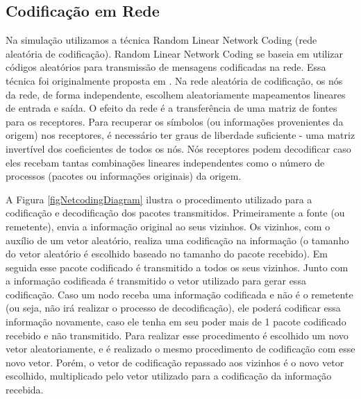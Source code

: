 \subsection{Codificação em Rede}\label{sec:codeRede}

Na simulação utilizamos a técnica Random Linear Network Coding (rede
aleatória de codificação). Random Linear Network Coding se baseia em
utilizar códigos aleatórios para transmissão de mensagens codificadas na
rede. Essa técnica foi originalmente proposta em \cite{Ho03thebenefits}.
Na rede aleatória de codificação, os nós da rede, de forma independente,
escolhem aleatoriamente mapeamentos lineares de entrada e saída. O efeito
da rede é a transferência de uma matriz de fontes para os receptores.
Para recuperar os símbolos (ou informações provenientes da origem) nos
receptores, é necessário ter graus de liberdade suficiente - uma matriz
invertível dos coeficientes de todos os nós. Nós receptores podem
decodificar caso eles recebam tantas combinações lineares independentes
como o número de processos (pacotes ou informações originais) da origem.

A Figura \ref{figNetcodingDiagram} ilustra o procedimento utilizado para
a codificação e decodificação dos pacotes transmitidos. Primeiramente a
fonte (ou remetente), envia a informação original ao seus vizinhos. Os
vizinhos, com o auxílio de um vetor aleatório, realiza uma codificação
na informação (o tamanho do vetor aleatório é escolhido baseado no
tamanho do pacote recebido). Em seguida esse pacote codificado é
transmitido a todos os seus vizinhos. Junto com a informação codificada
é transmitido o vetor utilizado para gerar essa codificação. Caso um
nodo receba uma informação codificada e não é o remetente (ou seja, não
irá realizar o processo de decodificação), ele poderá codificar essa
informação novamente, caso ele tenha em seu poder mais de 1 pacote
codificado recebido e não transmitido. Para realizar esse procedimento é
escolhido um novo vetor aleatoriamente, e é realizado o mesmo
procedimento de codificação com esse novo vetor. Porém, o vetor de
codificação repassado aos vizinhos é o novo vetor escolhido,
multiplicado pelo vetor utilizado para a codificação da informação
recebida.


